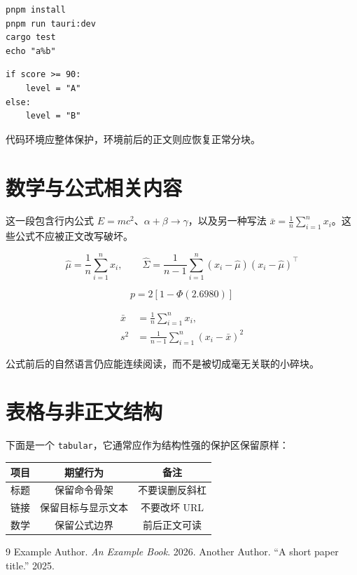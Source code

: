 \documentclass[a4paper,11pt]{article}
\begin{document}
\begin{lstlisting}
pnpm install
pnpm run tauri:dev
cargo test
echo "a%b"
\end{lstlisting}

\begin{verbatim}
if score >= 90:
    level = "A"
else:
    level = "B"
\end{verbatim}

代码环境应整体保护，环境前后的正文则应恢复正常分块。

\section{数学与公式相关内容}

这一段包含行内公式 $E=mc^2$、$\alpha+\beta\to\gamma$，以及另一种写法 \(\bar{x}=\frac{1}{n}\sum_{i=1}^{n}x_i\)。这些公式不应被正文改写破坏。

\[
  \hat{\mu} = \frac{1}{n}\sum_{i=1}^{n} x_i,\qquad
  \hat{\Sigma} = \frac{1}{n-1}\sum_{i=1}^{n}(x_i-\hat{\mu})(x_i-\hat{\mu})^\top
\]

\begin{equation}
  p = 2\left[1-\Phi(2.6980)\right]
\end{equation}

\begin{align}
  \bar{x} &= \frac{1}{n}\sum_{i=1}^{n} x_i, \\
  s^2 &= \frac{1}{n-1}\sum_{i=1}^{n}(x_i-\bar{x})^2
\end{align}

公式前后的自然语言仍应能连续阅读，而不是被切成毫无关联的小碎块。

\section{表格与非正文结构}

下面是一个 \texttt{tabular}，它通常应作为结构性强的保护区保留原样：
\begin{center}
\begin{tabular}{l|c|c}
项目 & 期望行为 & 备注 \\
\hline
标题 & 保留命令骨架 & 不要误删反斜杠 \\
链接 & 保留目标与显示文本 & 不要改坏 URL \\
数学 & 保留公式边界 & 前后正文可读 \\
\end{tabular}
\end{center}

\begin{thebibliography}{9}
 Example Author. \emph{An Example Book}. 2026.
 Another Author. ``A short paper title.'' 2025.
\end{thebibliography}
\end{document}
